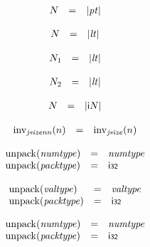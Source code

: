 $$
\begin{array}[t]{@{}lcl@{}l@{}}
N & = & {|{\mathit{pt}}|} \\
\end{array}
$$

$$
\begin{array}[t]{@{}lcl@{}l@{}}
N & = & {|{\mathit{lt}}|} \\
\end{array}
$$

$$
\begin{array}[t]{@{}lcl@{}l@{}}
N_1 & = & {|{\mathit{lt}}|} \\
\end{array}
$$

$$
\begin{array}[t]{@{}lcl@{}l@{}}
N_2 & = & {|{\mathit{lt}}|} \\
\end{array}
$$

$$
\begin{array}[t]{@{}lcl@{}l@{}}
N & = & {|{\mathsf{i}}{N}|} \\
\end{array}
$$

$$
\begin{array}[t]{@{}lcl@{}l@{}}
{\mathrm{inv}}_{\mathit{jsizenn}}(n) & = & {\mathrm{inv}}_{\mathit{jsize}}(n) \\
\end{array}
$$

\vspace{1ex}

$$
\begin{array}[t]{@{}lcl@{}l@{}}
{\mathrm{unpack}}({\mathit{numtype}}) & = & {\mathit{numtype}} \\
{\mathrm{unpack}}({\mathit{packtype}}) & = & \mathsf{i{\scriptstyle 32}} \\
\end{array}
$$

$$
\begin{array}[t]{@{}lcl@{}l@{}}
{\mathrm{unpack}}({\mathit{valtype}}) & = & {\mathit{valtype}} \\
{\mathrm{unpack}}({\mathit{packtype}}) & = & \mathsf{i{\scriptstyle 32}} \\
\end{array}
$$

$$
\begin{array}[t]{@{}lcl@{}l@{}}
{\mathrm{unpack}}({\mathit{numtype}}) & = & {\mathit{numtype}} \\
{\mathrm{unpack}}({\mathit{packtype}}) & = & \mathsf{i{\scriptstyle 32}} \\
\end{array}
$$

